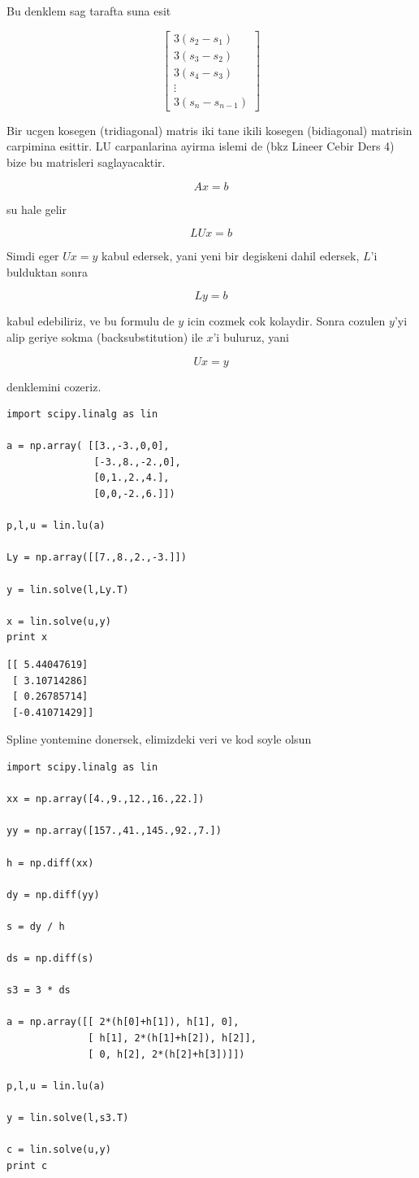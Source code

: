 \documentclass[12pt,fleqn]{article}\usepackage{../common}
\begin{document}
Bu denklem sag tarafta suna esit 

$$ 
\left[\begin{array}{r}
3(s_2 - s_1) \\
3(s_3 - s_2) \\
3(s_4 - s_3) \\
\vdots \\
3(s_n - s_{n-1}) 
\end{array}\right]
 $$

Bir ucgen kosegen (tridiagonal) matris iki tane ikili kosegen (bidiagonal)
matrisin carpimina esittir. LU carpanlarina ayirma islemi de (bkz Lineer
Cebir Ders 4) bize bu matrisleri saglayacaktir. 

$$ Ax = b $$

su hale gelir

$$ LUx = b $$

Simdi eger $Ux = y$ kabul edersek, yani yeni bir degiskeni dahil edersek,
$L$'i bulduktan sonra

$$ Ly = b $$

kabul edebiliriz, ve bu formulu de $y$ icin cozmek cok kolaydir. Sonra
cozulen $y$'yi alip geriye sokma (backsubstitution) ile $x$'i buluruz, yani 

$$ Ux = y $$ 

denklemini cozeriz. 

\begin{verbatim}
import scipy.linalg as lin

a = np.array( [[3.,-3.,0,0],
               [-3.,8.,-2.,0],
               [0,1.,2.,4.],
               [0,0,-2.,6.]])

p,l,u = lin.lu(a)

Ly = np.array([[7.,8.,2.,-3.]])

y = lin.solve(l,Ly.T)

x = lin.solve(u,y)
print x
\end{verbatim}

\begin{verbatim}
[[ 5.44047619]
 [ 3.10714286]
 [ 0.26785714]
 [-0.41071429]]
\end{verbatim}

Spline yontemine donersek, elimizdeki veri ve kod soyle olsun

\begin{verbatim}
import scipy.linalg as lin

xx = np.array([4.,9.,12.,16.,22.])

yy = np.array([157.,41.,145.,92.,7.])

h = np.diff(xx)

dy = np.diff(yy)

s = dy / h

ds = np.diff(s)

s3 = 3 * ds

a = np.array([[ 2*(h[0]+h[1]), h[1], 0],
              [ h[1], 2*(h[1]+h[2]), h[2]],
              [ 0, h[2], 2*(h[2]+h[3])]])

p,l,u = lin.lu(a)

y = lin.solve(l,s3.T)

c = lin.solve(u,y)
print c
\end{verbatim}
\end{document}
